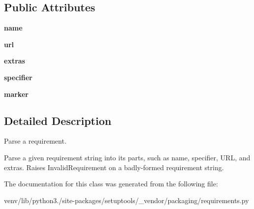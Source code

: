 \subsection*{Public Attributes}
\begin{DoxyCompactItemize}
\item 
\mbox{\label{classsetuptools_1_1__vendor_1_1packaging_1_1requirements_1_1_requirement_aded252a9fb2671dbb04b45d054ca0927}} 
{\bfseries name}
\item 
\mbox{\label{classsetuptools_1_1__vendor_1_1packaging_1_1requirements_1_1_requirement_a246d600c3de914fa7f8badf35c3cbc80}} 
{\bfseries url}
\item 
\mbox{\label{classsetuptools_1_1__vendor_1_1packaging_1_1requirements_1_1_requirement_a584915609dec44f9df6995e1b7d1d8aa}} 
{\bfseries extras}
\item 
\mbox{\label{classsetuptools_1_1__vendor_1_1packaging_1_1requirements_1_1_requirement_aa95165693626d812bb32d5d8031062d1}} 
{\bfseries specifier}
\item 
\mbox{\label{classsetuptools_1_1__vendor_1_1packaging_1_1requirements_1_1_requirement_af4e75090be4b6ff8af11bbd838a06a41}} 
{\bfseries marker}
\end{DoxyCompactItemize}


\subsection{Detailed Description}
\begin{DoxyVerb}Parse a requirement.

Parse a given requirement string into its parts, such as name, specifier,
URL, and extras. Raises InvalidRequirement on a badly-formed requirement
string.
\end{DoxyVerb}
 

The documentation for this class was generated from the following file\+:\begin{DoxyCompactItemize}
\item 
venv/lib/python3./site-\/packages/setuptools/\+\_\+vendor/packaging/requirements.\+py\end{DoxyCompactItemize}
